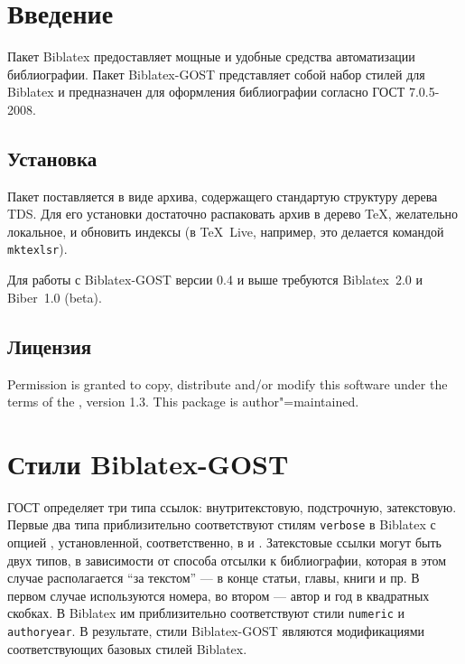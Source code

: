 \documentclass[11pt,a4paper,headings=small,numbers=enddot]{ltxdockit}[2011/03/25]
\newcommand*{\biber}{Biber\xspace}
\newcommand*{\biblatex}{Biblatex\xspace}
\newcommand*{\biblatexgost}{Biblatex-GOST\xspace}
\providecommand*{\printtitlepage}{}
\newcommand{\bibsty}{\texttt}
\begin{document}
\printtitlepage
\tableofcontents
\listoftables

\section{Введение}
\label{sec:int}

Пакет \biblatex{} 
предоставляет мощные и удобные средства автоматизации библиографии. 
Пакет \biblatexgost{} представляет 
собой набор стилей для \biblatex и предназначен для 
оформления библиографии согласно ГОСТ 7.0.5-2008. 

\subsection{Установка}
\label{sec:install}

Пакет поставляется в виде архива, содержащего стандартую структуру дерева TDS. 
Для его установки достаточно распаковать архив в дерево \TeX, желательно локальное, и 
обновить индексы (в \TeX\ Live, например, это делается командой \texttt{mktexlsr}).

Для работы с \biblatexgost версии 0.4 и выше требуются \biblatex~2.0 и \biber~1.0 (beta).

\subsection{Лицензия}
\label{sec:lic}

Permission is granted to copy, distribute and\slash or modify this software under the terms of the \lppl, version 1.3. This package is author"=maintained.


\section{Стили \biblatexgost}
\label{sec:styles}

ГОСТ определяет три типа ссылок: внутритекстовую, подстрочную, затекстовую.
Первые два типа приблизительно соответствуют стилям \bibsty{verbose} в \biblatex 
с опцией , установленной, соответственно, в  и 
. Затекстовые ссылки могут быть двух типов, в зависимости от 
способа отсылки к библиографии, которая в этом случае располагается \enquote{за текстом} 
--- в 
конце статьи, главы, книги и пр. В первом случае используются номера, во 
втором --- автор и год в квадратных скобках. В \biblatex им приблизительно 
соответствуют стили \bibsty{numeric} и \bibsty{authoryear}. В результате, 
стили \biblatexgost являются модификациями соответствующих базовых стилей 
\biblatex. 
\end{document}
